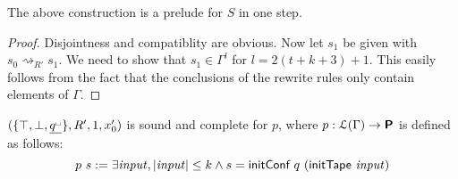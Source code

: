 \documentclass[a4paper,UKenglish,cleveref, autoref]{lipics-v2019}
\newcommand{\strent}{\rightsquigarrow}
\begin{document}
\begin{lemma}
  The above construction is a prelude for $S$ in one step. 
\end{lemma}
\begin{proof}
  Disjointness and compatiblity are obvious. 
  Now let $s_1$ be given with $s_0 \strent_{R'} s_1$. We need to show that $s_1 \in \Gamma^l$ for $l = 2 (t + k + 3) + 1$. 
  This easily follows from the fact that the conclusions of the rewrite rules only contain elements of $\Gamma$.
\end{proof}

\begin{lemma}\label{lem:nondetsc}
  $(\{\top, \bot, \underline{q^\blank}\}, R', 1, x_0')$ is sound and complete for $p$, where $p : \mathcal{L} (\Gamma) \rightarrow \textsf{\bfseries P}$ is defined as follows: 
  \[p~s := \exists \mathit{input}, |\mathit{input}| \le k \land s = \textsf{initConf}~q~(\textsf{initTape}~\mathit{input})\]
\end{lemma}
\end{document}
